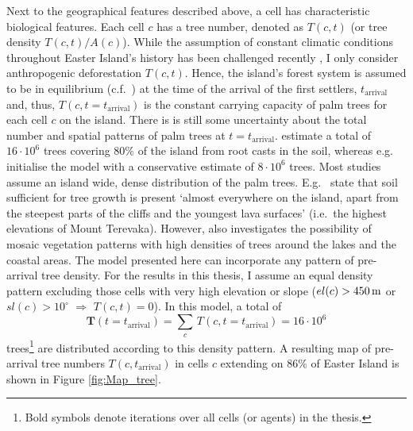 Next to the geographical features described above, a cell has characteristic biological features.%
Each cell $c$ has a tree number, denoted as $T(c,t)$ (or tree density $T(c,t)/A(c)$).
While the assumption of constant climatic conditions throughout Easter Island's history has been challenged recently \citep{Rull2020}, I only consider anthropogenic deforestation $T(c,t)$.
Hence, the island's forest system is assumed to be in equilibrium (c.f.\ \citet{Brander1998}) at the time of the arrival of the first settlers, $t_\text{arrival}$ and, thus, $T(c,t=t_\text{arrival})$ is the constant carrying capacity of palm trees for each cell $c$ on the island. 
There is is still some uncertainty about the total number and spatial patterns of palm trees at $t=t_\text{arrival}$.
\citet{Mieth2015} estimate a total of $16\cdot 10^6$ trees covering $80\%$ of the island from root casts in the soil, whereas e.g.\ \citet{Brandt2015} initialise the model with a conservative estimate of $8\cdot 10^6$ trees. 
Most studies assume an island wide, dense distribution of the palm trees. 
E.g.\ \citet{Bahn2017} state that soil sufficient for tree growth is present `almost everywhere on the island, apart from the steepest parts of the cliffs and the youngest lava surfaces' (i.e.\ the highest elevations of Mount Terevaka). 
However, \citet{Rull2020} also investigates the possibility of mosaic vegetation patterns with high densities of trees around the lakes and the coastal areas.
The model presented here can incorporate any pattern of pre-arrival tree density. 
For the results in this thesis, I assume an equal density pattern excluding those cells with very high elevation or slope ($el(c)>450\, {\rm m}$ or $sl(c)>10^\circ$ $\Rightarrow$ $T(c,t) = 0$).
In this model, a total of 
\begin{equation}
\mathbf{T}(t=t_\text{arrival}) = \sum_{c} \, T(c,t=t_\text{arrival}) =  16 \cdot 10^6
\end{equation} 
trees\footnote{Bold symbols denote iterations over all cells (or agents) in the thesis.} are distributed according to this density pattern.
A resulting map of pre-arrival tree numbers $T(c,t_\text{arrival})$ in cells $c$ extending on $86\%$ of Easter Island is shown in Figure \ref{fig:Map_tree}.

